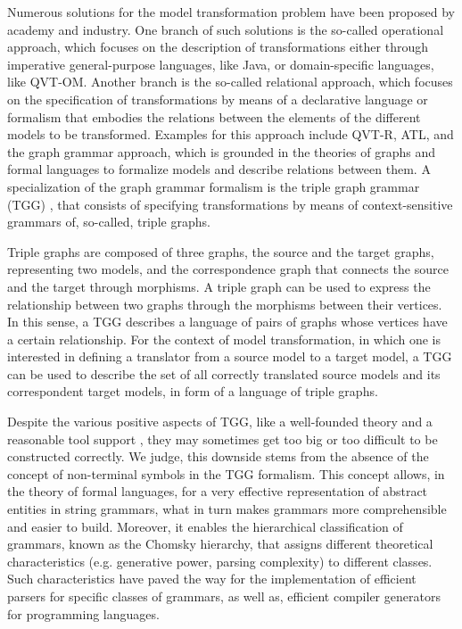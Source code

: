 Numerous solutions for the model transformation problem have been proposed by academy and industry. One branch of such solutions is the so-called operational approach, which focuses on the description of transformations either through imperative general-purpose languages, like Java, or domain-specific languages, like QVT-OM. Another branch is the so-called relational approach, which focuses on the specification of transformations by means of a declarative language or formalism that embodies the relations between the elements of the different models to be transformed. Examples for this approach include QVT-R, ATL, and the graph grammar approach, which is grounded in the theories of graphs and formal languages to formalize models and describe relations between them. A specialization of the graph grammar formalism is the triple graph grammar (TGG) \cite{schurr1994specification}, that consists of specifying transformations by means of context-sensitive grammars of, so-called, triple graphs.

Triple graphs are composed of three graphs, the source and the target graphs, representing two models, and the correspondence graph that connects the source and the target through morphisms. A triple graph can be used to express the relationship between two graphs through the morphisms between their vertices. In this sense, a TGG describes a language of pairs of graphs whose vertices have a certain relationship. For the context of model transformation, in which one is interested in defining a translator from a source model to a target model, a TGG can be used to describe the set of all correctly translated source models and its correspondent target models, in form of a language of triple graphs.

Despite the various positive aspects of TGG, like a well-founded theory and a reasonable tool support \cite{anjorin201620}, they may sometimes get too big or too difficult to be constructed correctly. We judge, this downside stems from the absence of the concept of non-terminal symbols in the TGG formalism. This concept allows, in the theory of formal languages, for a very effective representation of abstract entities in string grammars, what in turn makes grammars more comprehensible and easier to build. Moreover, it enables the hierarchical classification of grammars, known as the Chomsky hierarchy, that assigns different theoretical characteristics (e.g. generative power, parsing complexity) to different classes. Such characteristics have paved the way for the implementation of efficient parsers for specific classes of grammars, as well as, efficient compiler generators for programming languages.

